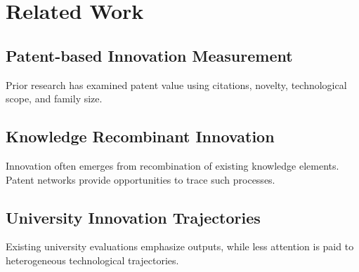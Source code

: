 
\section{Related Work}

\subsection{Patent-based Innovation Measurement}

Prior research has examined patent value using citations, novelty, technological scope, and family size.

\subsection{Knowledge Recombinant Innovation}

Innovation often emerges from recombination of existing knowledge elements. 
Patent networks provide opportunities to trace such processes.

\subsection{University Innovation Trajectories}

Existing university evaluations emphasize outputs, while less attention is paid to heterogeneous technological trajectories.
